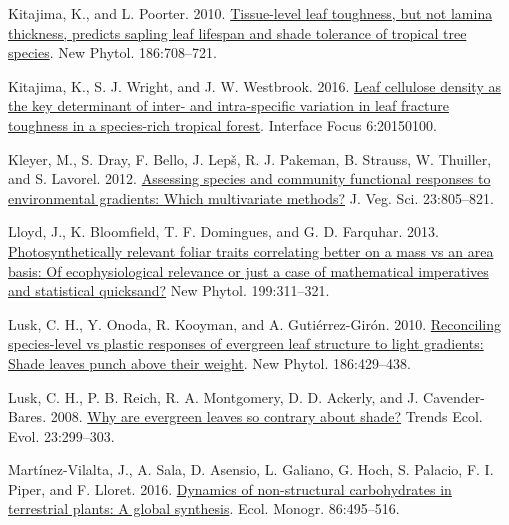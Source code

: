 \documentclass[
  12pt,
]{article}
\newlength{\cslhangindent}
\newlength{\cslentryspacingunit} %
\newenvironment{CSLReferences}[2] %
 {%
  \setlength{\parindent}{0pt}
  \ifodd #1
  \let\oldpar\par
  \def\par{\hangindent=\cslhangindent\oldpar}
  \fi
  \setlength{\parskip}{#2\cslentryspacingunit}
 }%
 {}
\begin{document}
\begin{CSLReferences}{1}{0}
\leavevmode{}%
Kitajima, K., and L. Poorter. 2010. \href{https://doi.org/10.1111/j.1469-8137.2010.03212.x}{Tissue-level leaf toughness, but not lamina thickness, predicts sapling leaf lifespan and shade tolerance of tropical tree species}. New Phytol. 186:708--721.

\leavevmode{}%
Kitajima, K., S. J. Wright, and J. W. Westbrook. 2016. \href{https://doi.org/10.1098/rsfs.2015.0100}{Leaf cellulose density as the key determinant of inter- and intra-specific variation in leaf fracture toughness in a species-rich tropical forest}. Interface Focus 6:20150100.

\leavevmode{}%
Kleyer, M., S. Dray, F. Bello, J. Lepš, R. J. Pakeman, B. Strauss, W. Thuiller, and S. Lavorel. 2012. \href{https://doi.org/10.1111/j.1654-1103.2012.01402.x}{Assessing species and community functional responses to environmental gradients: {Which} multivariate methods?} J. Veg. Sci. 23:805--821.

\leavevmode{}%
Lloyd, J., K. Bloomfield, T. F. Domingues, and G. D. Farquhar. 2013. \href{https://doi.org/10.1111/nph.12281}{Photosynthetically relevant foliar traits correlating better on a mass vs an area basis: {Of} ecophysiological relevance or just a case of mathematical imperatives and statistical quicksand?} New Phytol. 199:311--321.

\leavevmode{}%
Lusk, C. H., Y. Onoda, R. Kooyman, and A. Gutiérrez-Girón. 2010. \href{https://doi.org/10.1111/j.1469-8137.2010.03202.x}{Reconciling species-level vs plastic responses of evergreen leaf structure to light gradients: {Shade} leaves punch above their weight}. New Phytol. 186:429--438.

\leavevmode{}%
Lusk, C. H., P. B. Reich, R. A. Montgomery, D. D. Ackerly, and J. Cavender-Bares. 2008. \href{https://doi.org/10.1016/j.tree.2008.02.006}{Why are evergreen leaves so contrary about shade?} Trends Ecol. Evol. 23:299--303.

\leavevmode{}%
Martínez-Vilalta, J., A. Sala, D. Asensio, L. Galiano, G. Hoch, S. Palacio, F. I. Piper, and F. Lloret. 2016. \href{https://doi.org/10.1002/ecm.1231}{Dynamics of non-structural carbohydrates in terrestrial plants: A global synthesis}. Ecol. Monogr. 86:495--516.


\end{CSLReferences}
\end{document}
